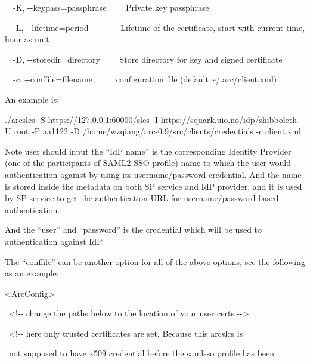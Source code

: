 \documentclass{article}
\begin{document}
{\color{black}
\ \ {}-K, -{}-keypass=passphrase \ \ \ \ Private key passphrase}

{\color{black}
\ \ {}-L, -{}-lifetime=period \ \ \ \ \ \ \ Lifetime of the certificate,
start with current time, hour as unit}

{\color{black}
\ \ {}-D, -{}-storedir=directory \ \ \ \ Store directory for key and
signed certificate}

{\color{black}
\ \ {}-c, -{}-conffile=filename \ \ \ \ \ configuration file (default
\~{}/.arc/client.xml)}

{\color{black}
An example is:}

{\color{black}
./arcslcs -S https://127.0.0.1:60000/slcs -I
https://squark.uio.no/idp/shibboleth -U root -P aa1122 -D
/home/wzqiang/arc-0.9/src/clients/credentials -c client.xml}

{\color{black}
Note user should input the {\textquotedblleft}IdP
name{\textquotedblright} is the corresponding Identity Provider (one of
the participants of SAML2 SSO profile) name to which the user would
authentication against by using its username/password credential. And
the name is stored inside the metadata on both SP service and IdP
provider, and it is used by SP service to get the authentication URL
for username/password based authentication.}

{\color{black}
And the {\textquotedblleft}user{\textquotedblright} and
{\textquotedblleft}password{\textquotedblright} is the credential which
will be used to authentication against IdP.}

{\color{black}
The {\textquotedblleft}conffile{\textquotedblright} can be another
option for all of the above options, see the following as an example:}

{\ttfamily\color{black}
{\textless}ArcConfig{\textgreater}}

{\ttfamily\color{black}
\ {\textless}!-{}- change the paths below to the location of your user
certs -{}-{\textgreater}}

{\ttfamily\color{black}
\ {\textless}!-{}- here only trusted certificates are set. Because this
arcslcs is}

{\ttfamily\color{black}
\ not supposed to have x509 credential before the samlsso profile has
been}
\end{document}
